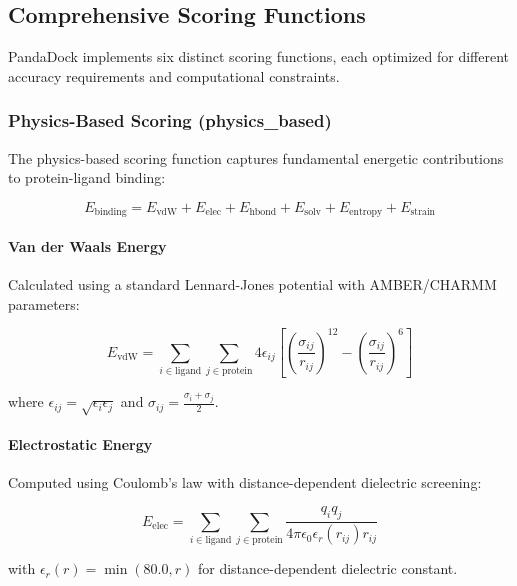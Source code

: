 \documentclass[11pt,a4paper]{article}
\begin{document}
\subsection{Comprehensive Scoring Functions}

PandaDock implements six distinct scoring functions, each optimized for different accuracy requirements and computational constraints.

\subsubsection{Physics-Based Scoring (physics\_based)}

The physics-based scoring function captures fundamental energetic contributions to protein-ligand binding:

\begin{equation}
E_{\text{binding}} = E_{\text{vdW}} + E_{\text{elec}} + E_{\text{hbond}} + E_{\text{solv}} + E_{\text{entropy}} + E_{\text{strain}}
\end{equation}

\paragraph{Van der Waals Energy}
Calculated using a standard Lennard-Jones potential with AMBER/CHARMM parameters:

\begin{equation}
E_{\text{vdW}} = \sum_{i \in \text{ligand}} \sum_{j \in \text{protein}} 4\epsilon_{ij}\left[\left(\frac{\sigma_{ij}}{r_{ij}}\right)^{12} - \left(\frac{\sigma_{ij}}{r_{ij}}\right)^6\right]
\end{equation}

where $\epsilon_{ij} = \sqrt{\epsilon_i \epsilon_j}$ and $\sigma_{ij} = \frac{\sigma_i + \sigma_j}{2}$.

\paragraph{Electrostatic Energy}
Computed using Coulomb's law with distance-dependent dielectric screening:

\begin{equation}
E_{\text{elec}} = \sum_{i \in \text{ligand}} \sum_{j \in \text{protein}} \frac{q_i q_j}{4\pi\epsilon_0 \epsilon_r(r_{ij}) r_{ij}}
\end{equation}

with $\epsilon_r(r) = \min(80.0, r)$ for distance-dependent dielectric constant.
\end{document}
